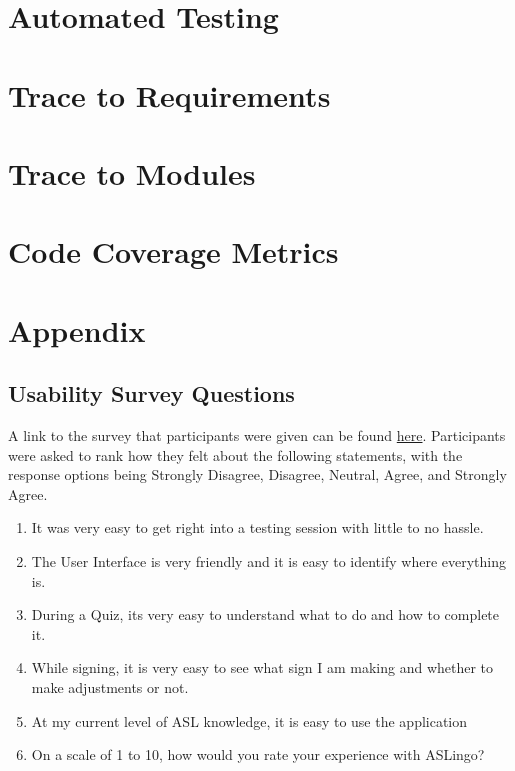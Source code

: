\documentclass[12pt, titlepage]{article}
\begin{document}
\section{Automated Testing}
		
\section{Trace to Requirements}
		
\section{Trace to Modules}		

\section{Code Coverage Metrics}




\newpage{}

\section{Appendix}

\subsection{Usability Survey Questions} \label{appen}

A link to the survey that participants were given can be found \href{https://docs.google.com/forms/d/e/1FAIpQLSelcMIJ-egkwLc7gO8MhqO35-FpTtQ6efCKnogOOKVVsrdWNA/viewform}{here}. Participants were asked to rank how they felt about the following statements, with the response options being Strongly Disagree, Disagree, Neutral, Agree, and Strongly Agree. 

\begin{enumerate}
\item It was very easy to get right into a testing session with little to no hassle. 
\item The User Interface is very friendly and it is easy to identify where everything is.
\item During a Quiz, its very easy to understand what to do and how to complete it.
\item While signing, it is very easy to see what sign I am making and whether to make adjustments or not.
\item At my current level of ASL knowledge, it is easy to use the application
\item On a scale of 1 to 10, how would you rate your experience with ASLingo? \newline [ 1 = terrible, 10 = fantastic]
\end{enumerate}
\end{document}
